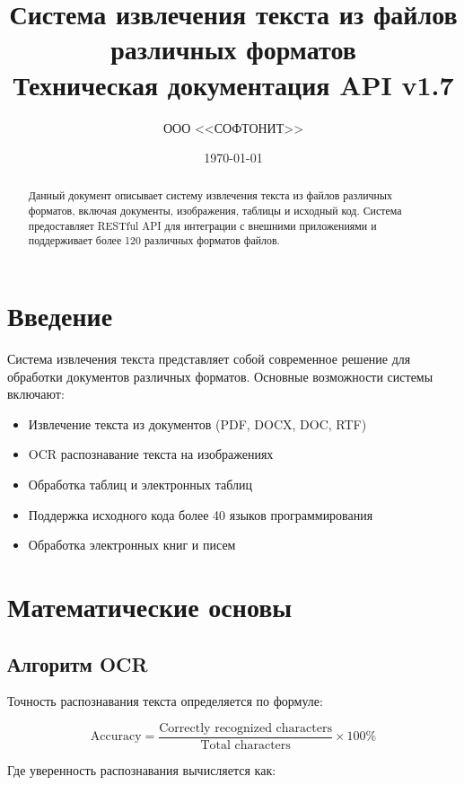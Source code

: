 \documentclass[12pt,a4paper]{article}
\title{\textbf{Система извлечения текста из файлов различных форматов} \\
       \large Техническая документация API v1.7}
\author{ООО <<СОФТОНИТ>>}
\date{\today}
\begin{document}
\maketitle

\begin{abstract}
Данный документ описывает систему извлечения текста из файлов различных форматов, включая документы, изображения, таблицы и исходный код. Система предоставляет RESTful API для интеграции с внешними приложениями и поддерживает более 120 различных форматов файлов.
\end{abstract}

\tableofcontents
\newpage

\section{Введение}

Система извлечения текста представляет собой современное решение для обработки документов различных форматов. Основные возможности системы включают:

\begin{itemize}
    \item Извлечение текста из документов (PDF, DOCX, DOC, RTF)
    \item OCR распознавание текста на изображениях
    \item Обработка таблиц и электронных таблиц
    \item Поддержка исходного кода более 40 языков программирования
    \item Обработка электронных книг и писем
\end{itemize}

\section{Математические основы}

\subsection{Алгоритм OCR}

Точность распознавания текста определяется по формуле:

\begin{equation}
\text{Accuracy} = \frac{\text{Correctly recognized characters}}{\text{Total characters}} \times 100\%
\end{equation}

Где уверенность распознавания вычисляется как:
\end{document}
